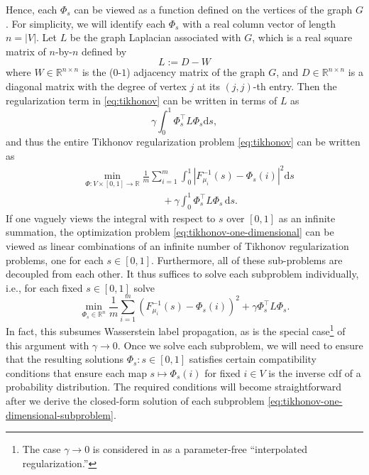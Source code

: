 \documentclass[letterpaper]{article} %
\begin{document}
Hence, each $\Phi_s$ can be viewed as a function defined on the vertices of the graph $G$. For simplicity, we will identify each $\Phi_s$ with a real column vector of length $n=\left| V \right|$. Let $L$ be the graph Laplacian associated with $G$, which is a real square matrix of $n$-by-$n$ defined by
\begin{equation*}
  L:=D-W
\end{equation*}
where $W\in \mathbb{R}^{n\times n}$ is the ($0$-$1$) adjacency matrix of the graph $G$, and $D\in \mathbb{R}^{n\times n}$ is a diagonal matrix with the degree of vertex $j$ at its $\left( j,j \right)$-th entry. Then the regularization term in \eqref{eq:tikhonov} can be written in terms of $L$ as
\begin{equation*}
  \gamma\int_0^1\Phi_s^{\top}L\Phi_s\mathrm{d}s,
\end{equation*}
and thus the entire Tikhonov regularization problem \eqref{eq:tikhonov} can be written as
\begin{equation}\label{eq:tikhonov-one-dimensional}
  \begin{aligned}
      &\min_{\Phi:V\times \left[ 0,1 \right]\rightarrow \mathbb{R}}\frac{1}{m}\sum_{i=1}^m\int_0^1 \left| F_{\mu_i}^{-1}\left( s \right)-\Phi_s \left( i \right) \right|^2\mathrm{d}s\\
      &\qquad \qquad\qquad \qquad +\gamma\int_0^1\Phi_s^{\top}L\Phi_s\,\mathrm{d}s.
  \end{aligned}
\end{equation}
If one vaguely views the integral with respect to $s$ over $\left[ 0,1 \right]$ as an infinite summation, the optimization problem \eqref{eq:tikhonov-one-dimensional} can be viewed as linear combinations of an infinite number of Tikhonov regularization problems, one for each $s\in \left[ 0,1 \right]$. Furthermore, all of these sub-problems are decoupled from each other. It thus suffices to solve each subproblem individually, i.e., for each fixed $s\in \left[ 0,1 \right]$ solve
\begin{equation}
  \label{eq:tikhonov-one-dimensional-subproblem}
  \min_{\Phi_s\in\mathbb{R}^n}\frac{1}{m}\sum_{i=1}^m \left( F_{\mu_i}^{-1}\left( s \right)-\Phi_s \left( i \right) \right)^2+\gamma \Phi_s^{\top}L\Phi_s.
\end{equation}
In fact, this subsumes Wasserstein label propagation, as \cite[Proposition 2]{Solomon:2014} is the special case\footnote{The case $\gamma\rightarrow0$ is considered in \cite{Belkin2004} as a parameter-free ``interpolated regularization.''} of this argument with $\gamma\rightarrow 0$. Once we solve each subproblem,  we will need to ensure that the resulting solutions $\Phi_s:s\in \left[ 0,1 \right]$ satisfies certain compatibility conditions that ensure each map $s\mapsto \Phi_s \left( i \right)$ for fixed $i\in V$ is the inverse cdf of a probability distribution. The required conditions will become straightforward after we derive the closed-form solution of each subproblem \eqref{eq:tikhonov-one-dimensional-subproblem}.
\end{document}
